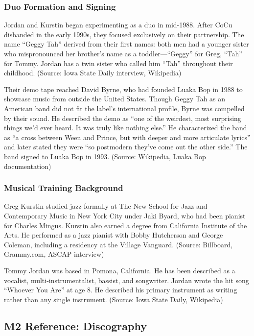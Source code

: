 \documentclass[11pt,letterpaper]{article}
\begin{document}
\subsubsection{Duo Formation and Signing}

Jordan and Kurstin began experimenting as a duo in mid-1988. After CoCu disbanded in the early 1990s, they focused exclusively on their partnership. The name ``Geggy Tah'' derived from their first names: both men had a younger sister who mispronounced her brother's name as a toddler---``Geggy'' for Greg, ``Tah'' for Tommy. Jordan has a twin sister who called him ``Tah'' throughout their childhood. (Source: Iowa State Daily interview, Wikipedia)

Their demo tape reached David Byrne, who had founded Luaka Bop in 1988 to showcase music from outside the United States. Though Geggy Tah as an American band did not fit the label's international profile, Byrne was compelled by their sound. He described the demo as ``one of the weirdest, most surprising things we'd ever heard. It was truly like nothing else.'' He characterized the band as ``a cross between Ween and Prince, but with deeper and more articulate lyrics'' and later stated they were ``so postmodern they've come out the other side.'' The band signed to Luaka Bop in 1993. (Source: Wikipedia, Luaka Bop documentation)

\subsubsection{Musical Training Background}

Greg Kurstin studied jazz formally at The New School for Jazz and Contemporary Music in New York City under Jaki Byard, who had been pianist for Charles Mingus. Kurstin also earned a degree from California Institute of the Arts. He performed as a jazz pianist with Bobby Hutcherson and George Coleman, including a residency at the Village Vanguard. (Source: Billboard, Grammy.com, ASCAP interview)

Tommy Jordan was based in Pomona, California. He has been described as a vocalist, multi-instrumentalist, bassist, and songwriter. Jordan wrote the hit song ``Whoever You Are'' at age 8. He described his primary instrument as writing rather than any single instrument. (Source: Iowa State Daily, Wikipedia)

\subsection{M2 Reference: Discography}
\end{document}
